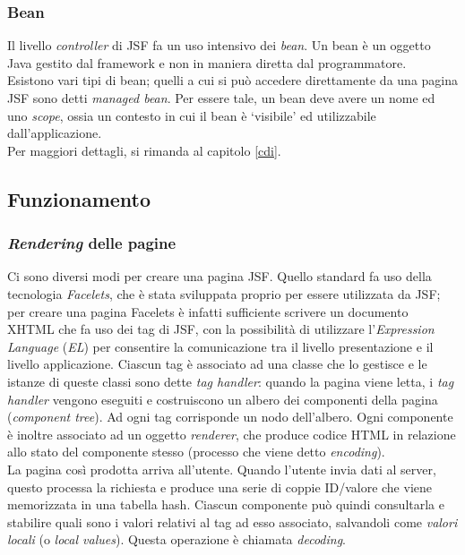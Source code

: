 \subsubsection{Bean}

Il livello \textit{controller} di JSF fa un uso intensivo dei \textsl{bean}. Un bean è un oggetto Java gestito dal framework e non in maniera diretta dal programmatore.\\
Esistono vari tipi di bean; quelli a cui si può accedere direttamente da una pagina JSF sono detti \textit{managed bean}. Per essere tale, un bean deve avere un nome ed uno \textit{scope}, ossia un contesto in cui il bean è \textquoteleft visibile\textquoteright{} ed utilizzabile dall'applicazione. \\
Per maggiori dettagli, si rimanda al capitolo \ref{cdi}.


\subsection{Funzionamento}

\subsubsection{\textit{Rendering} delle pagine}
Ci sono diversi modi per creare una pagina JSF. Quello standard fa uso della tecnologia \textsl{Facelets}, che è stata sviluppata proprio per essere utilizzata da JSF; per creare una pagina Facelets è infatti sufficiente scrivere un documento XHTML che fa uso dei tag di JSF, con la possibilità di utilizzare l'\textsl{Expression Language} (\textsl{EL}) per consentire la comunicazione tra il livello presentazione e il livello applicazione. Ciascun tag è associato ad una classe che lo gestisce e le istanze di queste classi sono dette \textit{tag handler}: quando la pagina viene letta, i \textit{tag handler} vengono eseguiti e costruiscono un albero dei componenti della pagina (\textit{component tree}). Ad ogni tag corrisponde un nodo dell'albero. Ogni componente è inoltre associato ad un oggetto \textit{renderer}, che produce codice HTML in relazione allo stato del componente stesso (processo che viene detto \textit{encoding}).\\
La pagina così prodotta arriva all'utente. Quando l'utente invia dati al server, questo processa la richiesta e produce una serie di coppie ID/valore che viene memorizzata in una tabella hash. Ciascun componente può quindi consultarla e stabilire quali sono i valori relativi al tag ad esso associato, salvandoli come \textsl{valori locali} (o \textit{local values}). Questa operazione è chiamata \textit{decoding}.\\

